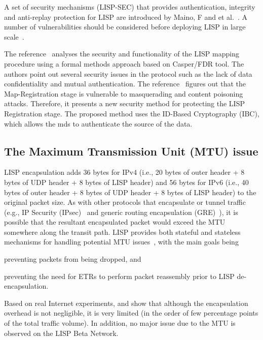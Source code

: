 A set of security mechanisms (LISP-SEC) that provides authentication, integrity and anti-replay protection for LISP are introduced by Maino, F and et al.~\cite{maino2017lisp}. A number of vulnerabilities should be considered before deploying LISP in large scale~\cite{raheem2013supporting}.

The reference~\cite{aiash2013novel} analyses the security and functionality of the LISP mapping procedure using a formal methods approach based on Casper/FDR tool. The authors point out several security issues in the protocol such as the lack of data confidentiality and mutual authentication. The reference~\cite{aiash2013securing} figures out that the Map-Registration stage is vulnerable to masquerading and content poisoning attacks. Therefore, it presents a new security method for protecting the LISP Registration stage. The proposed method uses the ID-Based Cryptography (IBC), which allows the \acrshort{mds} to authenticate the source of the data. 

\subsection{The Maximum Transmission Unit (MTU) issue}
\label{subsubsec:mtu}
LISP encapsulation adds 36 bytes for IPv4 (i.e., 20 bytes of outer header + 8 bytes of UDP header + 8 bytes of LISP header) and 56 bytes for IPv6 (i.e., 40 bytes of outer header + 8 bytes of UDP header + 8 bytes of LISP header) to the original packet size. As with other protocols that encapsulate or tunnel traffic (e.g., IP Security (IPsec)~\cite{thayer1998rfc} and generic routing encapsulation (GRE)~\cite{farinacci2000generic}), it is possible that the resultant encapsulated packet would exceed the MTU somewhere along the transit path. LISP provides both stateful and stateless mechanisms for handling potential MTU issues~\cite{CiscoLISPQA}, with the main goals being 
\begin{enumerate*}[label=(\roman*)]
	\item preventing packets from being dropped, and
	\item preventing the need for ETRs to perform packet reassembly prior to LISP de-encapsulation. 
\end{enumerate*}

Based on real Internet experiments, \cite{lispCacheCost} and \cite{kim2013caching} show that although the encapsulation overhead is not negligible, it is very limited (in the order of few percentage points of the total traffic volume). In addition, no major issue due to the MTU is observed on the LISP Beta Network.


